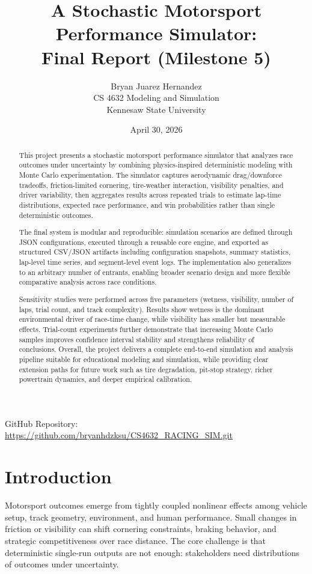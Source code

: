 \documentclass[12pt]{article}
\title{A Stochastic Motorsport Performance Simulator:\\Final Report (Milestone 5)}
\author{Bryan Juarez Hernandez\\CS 4632 Modeling and Simulation\\Kennesaw State University}
\date{April 30, 2026}
\begin{document}
\maketitle
\begin{center}
GitHub Repository: \url{https://github.com/bryanhdzksu/CS4632_RACING_SIM.git}
\end{center}

\begin{abstract}
This project presents a stochastic motorsport performance simulator that analyzes race outcomes under uncertainty by combining physics-inspired deterministic modeling with Monte Carlo experimentation. The simulator captures aerodynamic drag/downforce tradeoffs, friction-limited cornering, tire-weather interaction, visibility penalties, and driver variability, then aggregates results across repeated trials to estimate lap-time distributions, expected race performance, and win probabilities rather than single deterministic outcomes.

The final system is modular and reproducible: simulation scenarios are defined through JSON configurations, executed through a reusable core engine, and exported as structured CSV/JSON artifacts including configuration snapshots, summary statistics, lap-level time series, and segment-level event logs. The implementation also generalizes to an arbitrary number of entrants, enabling broader scenario design and more flexible comparative analysis across race conditions.

Sensitivity studies were performed across five parameters (wetness, visibility, number of laps, trial count, and track complexity). Results show wetness is the dominant environmental driver of race-time change, while visibility has smaller but measurable effects. Trial-count experiments further demonstrate that increasing Monte Carlo samples improves confidence interval stability and strengthens reliability of conclusions. Overall, the project delivers a complete end-to-end simulation and analysis pipeline suitable for educational modeling and simulation, while providing clear extension paths for future work such as tire degradation, pit-stop strategy, richer powertrain dynamics, and deeper empirical calibration.
\end{abstract}

\newpage
\tableofcontents
\listoffigures
\listoftables
\newpage

\section{Introduction}
Motorsport outcomes emerge from tightly coupled nonlinear effects among vehicle setup, track geometry, environment, and human performance. Small changes in friction or visibility can shift cornering constraints, braking behavior, and strategic competitiveness over race distance. The core challenge is that deterministic single-run outputs are not enough: stakeholders need distributions of outcomes under uncertainty.
\end{document}
